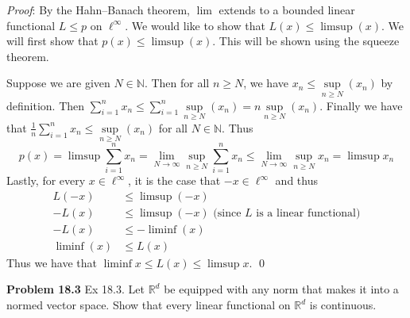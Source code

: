 \documentclass[12pt]{article}
\newcommand{\problem}[1]{\hspace{-4 ex} \large \textbf{Problem #1} }
\renewenvironment{proof}{\hspace{-4 ex} \emph{Proof}:}{\qed}
\newcommand{\RR}{\mathbb{R}}
\newcommand{\NN}{\mathbb{N}}
\begin{document}
\begin{proof}
		By the Hahn--Banach theorem, $\lim$ extends to a bounded linear functional $L \leq p$ on $\ell^\infty$. 
		We would like to show that $L(x)\leq \limsup(x)$. We will first show that $p(x) \leq \limsup(x)$. This will be shown using the squeeze theorem. \bigbreak
		
		Suppose we are given $N \in \NN$. Then for all $n \geq N$, we have $x_n \leq \sup\limits_{n \geq N}(x_n)$ by definition. Then $\sum\limits_{i=1}^n x_n \leq \sum\limits_{i=1}^n \sup\limits_{n \geq N}(x_n) = n \sup\limits_{n \geq N}(x_n)$. Finally we have that $\tfrac{1}{n}\sum\limits_{i=1}^n x_n \leq \sup\limits_{n \geq N}(x_n)$ for all $N \in \NN$. Thus
		$$
		p(x) = \limsup\sum\limits_{i=1}^n x_n = \lim_{N \to \infty} \sup\limits_{n \geq N}\sum\limits_{i=1}^n x_n \leq \lim_{N \to \infty} \sup\limits_{n \geq N} x_n = \limsup x_n
		$$
		Lastly, for every $x \in \ell^\infty$, it is the case that $-x \in \ell^\infty$ and thus
		\begin{align*}
			L(-x) & \leq \limsup(-x) \\
			-L(x) & \leq \limsup(-x) \text{\ \ (since $L$ is a linear functional)} \\
			-L(x) & \leq -\liminf(x) \\
			\liminf(x) & \leq L(x)
		\end{align*}
		Thus we have that $\liminf x \leq L(x) \leq \limsup x$.
	\end{proof}

\problem{18.3}
Ex 18.3. Let $\RR^d$ be equipped with any norm that makes it into a normed vector space. Show that every linear functional on $\RR^d$ is continuous.
\end{document}
